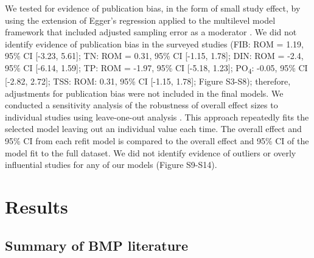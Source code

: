 \documentclass[utf8]{FrontiersinHarvard}
\begin{document}
We tested for evidence of publication bias, in the form of small study effect, by using the extension of Egger's regression applied to the multilevel model framework that included adjusted sampling error as a moderator \citep{nakagawaQuantitativeEvidenceSynthesis2023}.
We did not identify evidence of publication bias in the surveyed studies (FIB: ROM = 1.19, 95\% CI {[}-3.23, 5.61{]}; TN: ROM = 0.31, 95\% CI {[}-1.15, 1.78{]}; DIN: ROM = -2.4, 95\% CI {[}-6.14, 1.59{]}; TP: ROM = -1.97, 95\% CI {[}-5.18, 1.23{]}; PO\textsubscript{4}: -0.05, 95\% CI {[}-2.82, 2.72{]}; TSS: ROM: 0.31, 95\% CI {[}-1.15, 1.78{]}; Figure S3-S8); therefore, adjustments for publication bias were not included in the final models.
We conducted a sensitivity analysis of the robustness of overall effect sizes to individual studies using leave-one-out analysis \citep{nakagawaQuantitativeEvidenceSynthesis2023}.
This approach repeatedly fits the selected model leaving out an individual value each time.
The overall effect and 95\% CI from each refit model is compared to the overall effect and 95\% CI of the model fit to the full dataset.
We did not identify evidence of outliers or overly influential studies for any of our models (Figure S9-S14).

\hypertarget{results}{%
\section{Results}\label{results}}

\hypertarget{summary-of-bmp-literature}{%
\subsection{Summary of BMP literature}\label{summary-of-bmp-literature}}
\end{document}
